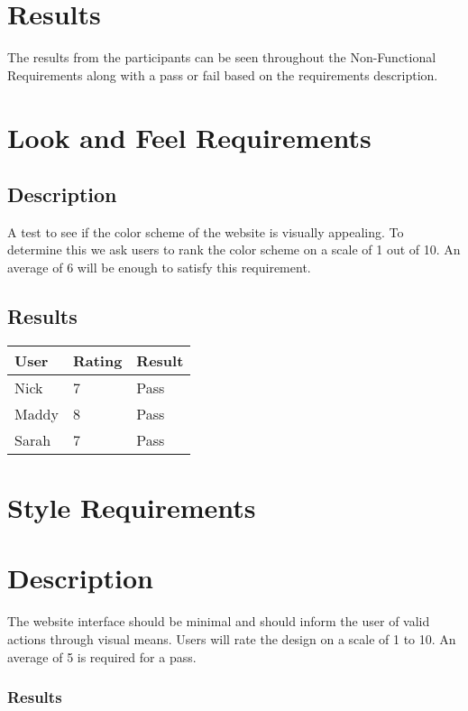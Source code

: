 \documentclass{scrreprt}
\begin{document}
\section{Results}
\begin{flushleft}
The results from the participants can be seen throughout the Non-Functional Requirements along with a pass or fail based on the requirements description.
\end{flushleft}

\section{Look and Feel Requirements}

\subsection{Description}
\begin{flushleft}
A test to see if the color scheme of the website is visually appealing. To determine this we ask users to rank the color scheme on a scale of 1 out of 10. An average of 6 will be enough to satisfy this requirement.
\subsection{Results}
\end{flushleft}
 
 \centering
 \begin{tabular}{||p{2.5cm}|p{2.5cm}|p{2.5cm}||}
 \hline
 \bf User & \bf Rating & \bf Result\\
 \hline\hline
 Nick & 7 & Pass \\
 \hline
 Maddy & 8 & Pass\\ %
 \hline
 Sarah & 7 & Pass \\
 \hline
 \end{tabular}

\section{Style Requirements}

\section{Description}
\begin{flushleft}
The website interface should be minimal and should inform the user of valid actions through visual means. Users will rate the design on a scale of 1 to 10. An average of 5 is required for a pass.
\subsubsection{Results}
\end{flushleft}
 
\end{document}
